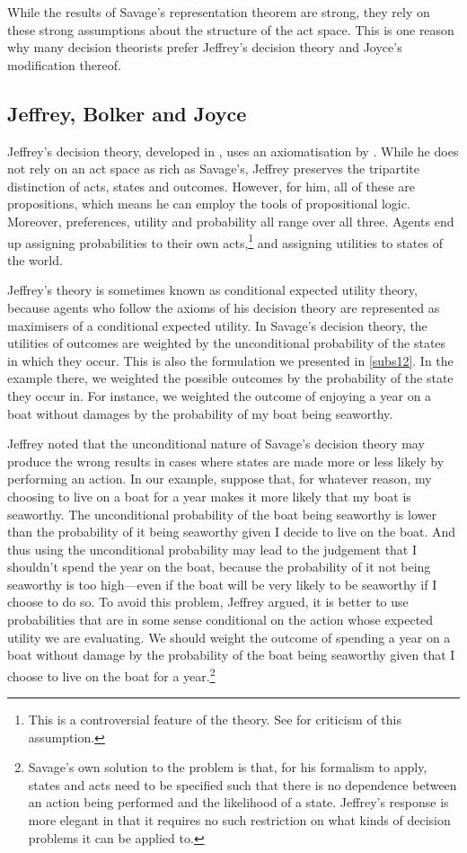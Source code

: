 While the results of Savage's representation theorem are strong, they rely on these strong assumptions about the structure of the act space. This is one reason why many decision theorists prefer Jeffrey's decision theory and Joyce's modification thereof.

\subsection{Jeffrey, Bolker and Joyce}\label{subs24}

Jeffrey's decision theory, developed in \citet{Jeffrey1983}, uses an axiomatisation by \citet{Bolker1966}. While he does not rely on an act space as rich as Savage's, Jeffrey preserves the tripartite distinction of acts, states and outcomes. However, for him, all of these are propositions, which means he can employ the tools of propositional logic. Moreover, preferences, utility and probability all range over all three. Agents end up assigning probabilities to their own acts,\footnote{This is a controversial feature of the theory. See \citet{Spohn1977} for criticism of this assumption.} and assigning utilities to states of the world.

Jeffrey's theory is sometimes known as conditional expected utility theory, because agents who follow the axioms of his decision theory are represented as maximisers of a conditional expected utility. In Savage's decision theory, the utilities of outcomes are weighted by the unconditional probability of the states in which they occur. This is also the formulation we presented in \autoref{subs12}. In the example there, we weighted the possible outcomes by the probability of the state they occur in. For instance, we weighted the outcome of enjoying a year on a boat without damages by the probability of my boat being seaworthy.

Jeffrey noted that the unconditional nature of Savage's decision theory may produce the wrong results in cases where states are made more or less likely by performing an action. In our example, suppose that, for whatever reason, my choosing to live on a boat for a year makes it more likely that my boat is seaworthy. The unconditional probability of the boat being seaworthy is lower than the probability of it being seaworthy given I decide to live on the boat. And thus using the unconditional probability may lead to the judgement that I shouldn't spend the year on the boat, because the probability of it not being seaworthy is too high---even if the boat will be very likely to be seaworthy if I choose to do so. To avoid this problem, Jeffrey argued, it is better to use probabilities that are in some sense conditional on the action whose expected utility we are evaluating. We should weight the outcome of spending a year on a boat without damage by the probability of the boat being seaworthy given that I choose to live on the boat for a year.\footnote{Savage's own solution to the problem is that, for his formalism to apply, states and acts need to be specified such that there is no dependence between an action being performed and the likelihood of a state. Jeffrey's response is more elegant in that it requires no such restriction on what kinds of decision problems it can be applied to.}

